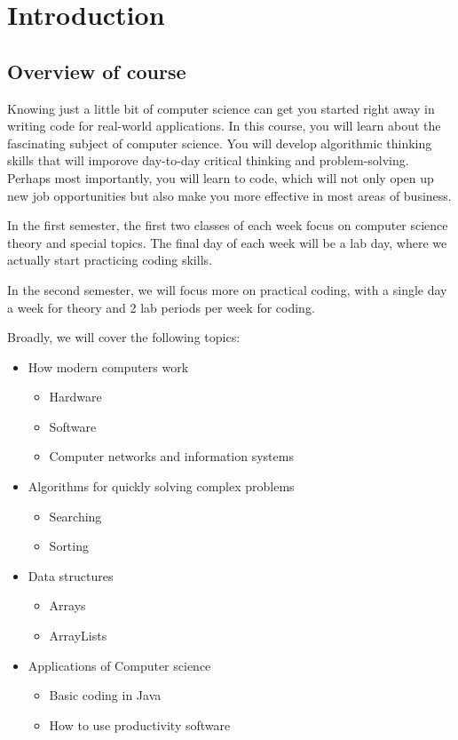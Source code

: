 \chapter{Introduction}

\section{Overview of course}

Knowing just a little bit of computer science can get you started right away in
writing code for real-world applications. In this course, you will learn about
the fascinating subject of computer science. You will develop algorithmic
thinking skills that will imporove day-to-day critical thinking and
problem-solving. Perhaps most importantly, you will learn to code, which will
not only open up new job opportunities but also make you more effective in most
areas of business.

 In the first semester, the first two classes of each
week focus on computer science theory and special topics. The final day of each
week will be a lab day, where we actually start practicing coding skills.

In the second semester, we will focus more on practical coding, with a single day a week for theory and 2 lab periods per week for coding. 

Broadly, we will cover the following topics:
\begin{itemize}
    \item How modern computers work
    	\begin{itemize}
       		\item Hardware
       		\item Software
       		\item Computer networks and information systems
    	\end{itemize}
    \item Algorithms for quickly solving complex problems
    	\begin{itemize}
       		\item Searching
       		\item Sorting
    	\end{itemize}
    \item Data structures 
    	\begin{itemize}
       		\item Arrays
       		\item ArrayLists
    	\end{itemize}
    \item Applications of Computer science
    	\begin{itemize}
       		\item Basic coding in Java
       		\item How to use productivity software
    	\end{itemize}
    \end{itemize}

